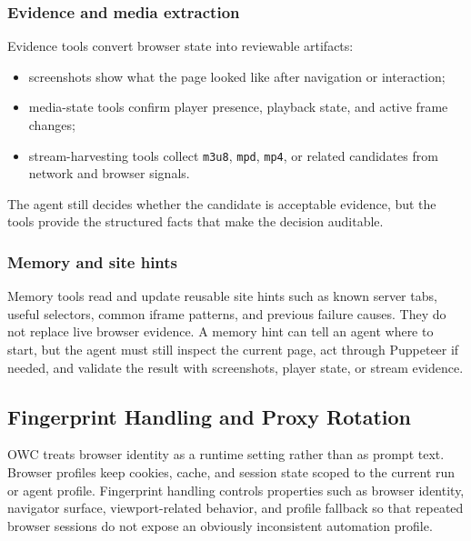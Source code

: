 

\subsubsection{Evidence and media extraction}

Evidence tools convert browser state into reviewable artifacts:
\begin{itemize}
  \item screenshots show what the page looked like after navigation or interaction;
  \item media-state tools confirm player presence, playback state, and active frame
  changes;
  \item stream-harvesting tools collect \texttt{m3u8}, \texttt{mpd}, \texttt{mp4}, or
  related candidates from network and browser signals.
\end{itemize}

The agent still decides whether the candidate is acceptable evidence, but the tools
provide the structured facts that make the decision auditable.



\subsubsection{Memory and site hints}

Memory tools read and update reusable site hints such as known server tabs, useful
selectors, common iframe patterns, and previous failure causes. They do not replace
live browser evidence. A memory hint can tell an agent where to start, but the agent
must still inspect the current page, act through Puppeteer if needed, and validate the
result with screenshots, player state, or stream evidence.



\subsection{Fingerprint Handling and Proxy Rotation}

OWC treats browser identity as a runtime setting rather than as prompt text. Browser
profiles keep cookies, cache, and session state scoped to the current run or agent
profile. Fingerprint handling controls properties such as browser identity, navigator
surface, viewport-related behavior, and profile fallback so that repeated browser
sessions do not expose an obviously inconsistent automation profile.

